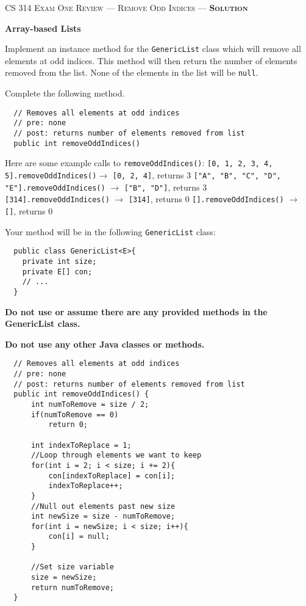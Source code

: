 \documentclass[12pt,letter]{article}
\begin{document}
\noindent\textsc{\large CS 314 Exam One Review --- Remove Odd Indices --- \textbf{Solution}}

\vspace{6pt}
\noindent\textbf{Array-based Lists}

\vspace{2pt}
\noindent Implement an instance method for the \texttt{GenericList} class which will 
remove all elements at odd indices. This method will then return the number of elements
removed from the list. None of the elements in the list will be \texttt{null}.

\vspace{4pt}
\noindent Complete the following method.
\begin{verbatim}
  // Removes all elements at odd indices
  // pre: none
  // post: returns number of elements removed from list
  public int removeOddIndices()
\end{verbatim}

\vspace{4pt}

\noindent Here are some example calls to \texttt{removeOddIndices()}:
\newline
\noindent \texttt{[0, 1, 2, 3, 4, 5].removeOddIndices()}$ \rightarrow $ \texttt{[0, 2, 4]}, returns 3
\newline
\noindent \texttt{["A", "B", "C", "D", "E"].removeOddIndices()} $ \rightarrow $ \texttt{["B", "D"]}, returns 3
\newline
\noindent \texttt{[314].removeOddIndices()} $\rightarrow$ \texttt{[314]}, returns 0
\newline
\noindent \texttt{[].removeOddIndices()} $\rightarrow$ \texttt{[]}, returns 0
\newline

\noindent Your method will be in the following \texttt{GenericList} class:

\begin{verbatim}
  public class GenericList<E>{
    private int size;
    private E[] con;
    // ...
  }

\end{verbatim}

\noindent \textbf{Do not use or assume there are any provided methods in the GenericList class.}

\noindent \textbf{Do not use any other Java classes or methods.}

\clearpage
\begin{verbatim}
  // Removes all elements at odd indices
  // pre: none
  // post: returns number of elements removed from list
  public int removeOddIndices() {
      int numToRemove = size / 2;
      if(numToRemove == 0)
          return 0;

      int indexToReplace = 1;
      //Loop through elements we want to keep
      for(int i = 2; i < size; i += 2){
          con[indexToReplace] = con[i];
          indexToReplace++;
      }
      //Null out elements past new size
      int newSize = size - numToRemove;
      for(int i = newSize; i < size; i++){
          con[i] = null;
      }

      //Set size variable
      size = newSize;
      return numToRemove;
  } 
\end{verbatim}
\end{document}
